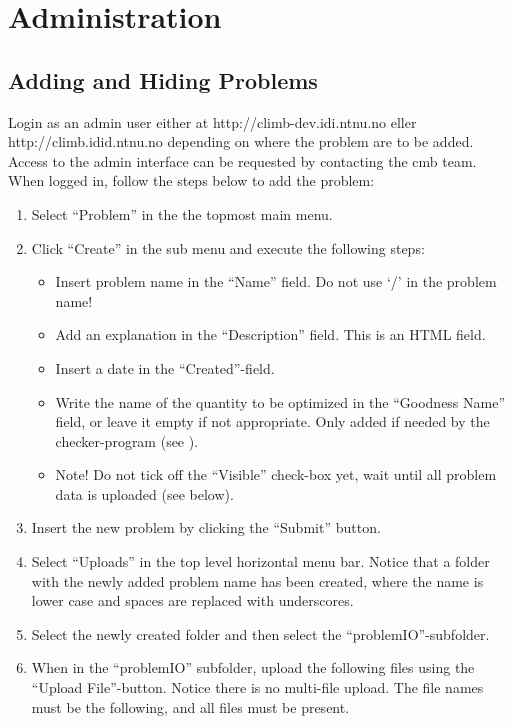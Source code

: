 \chapter{Administration}
\label{apdx:problems}

\section{Adding and Hiding Problems}
Login as an admin user either at http://climb-dev.idi.ntnu.no eller http://climb.idid.ntnu.no depending on where the problem are to be added. Access to the admin interface can be requested by contacting the \gls{cmb} team. When logged in, follow the steps below to add the problem:
\begin{enumerate}
  \item Select ``Problem'' in the the topmost main menu.
  \item Click ``Create'' in the sub menu and execute the following steps:
  \begin{itemize}
    \item Insert problem name in the ``Name'' field. Do not use ‘/’ in the problem name!
    \item Add an explanation in the ``Description'' field. This is an HTML field.
    \item Insert a date in the ``Created''-field.
    \item Write the name of the quantity to be optimized in the ``Goodness Name'' field, or leave it empty if not appropriate. Only added if needed by the checker-program (see \Cref{}).
    \item Note! Do not tick off the ``Visible'' check-box yet, wait until all problem data is uploaded (see below).
  \end{itemize}
  \item Insert the new problem by clicking the ``Submit'' button.
  \item Select ``Uploads'' in the top level horizontal menu bar. Notice that a folder with the newly added problem name has been created, where the name is lower case and spaces are replaced with underscores.
  \item Select the newly created folder and then select the ``problemIO''-subfolder.
  \item When in the ``problemIO'' subfolder, upload the following files using the ``Upload File''-button. Notice there is no multi-file upload. The file names must be the following, and all files must be present.
  \begin{itemize}

\end{itemize}
\end{enumerate}
